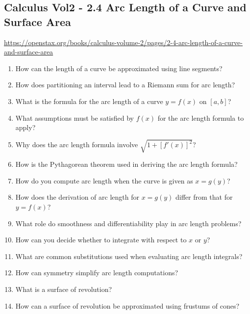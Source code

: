 \subsection{Calculus Vol2 - 2.4 Arc Length of a Curve and Surface Area}

\url{https://openstax.org/books/calculus-volume-2/pages/2-4-arc-length-of-a-curve-and-surface-area}

\begin{enumerate}

\item How can the length of a curve be approximated using line segments?

\item How does partitioning an interval lead to a Riemann sum for arc length?

\item What is the formula for the arc length of a curve $y=f(x)$ on $[a,b]$?

\item What assumptions must be satisfied by $f(x)$ for the arc length formula to apply?

\item Why does the arc length formula involve $\sqrt{1+[f'(x)]^2}$?

\item How is the Pythagorean theorem used in deriving the arc length formula?

\item How do you compute arc length when the curve is given as $x=g(y)$?

\item How does the derivation of arc length for $x=g(y)$ differ from that for $y=f(x)$?

\item What role do smoothness and differentiability play in arc length problems?

\item How can you decide whether to integrate with respect to $x$ or $y$?

\item What are common substitutions used when evaluating arc length integrals?

\item How can symmetry simplify arc length computations?

\item What is a surface of revolution?

\item How can a surface of revolution be approximated using frustums of cones?


\end{enumerate}
